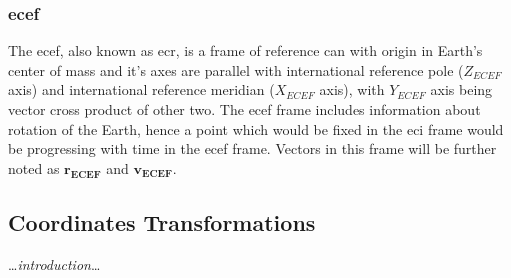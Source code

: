     \subsubsection{\ac*{ecef}}
        The \ac{ecef}, also known as \ac{ecr}, is a frame of reference can with origin in Earth's center of mass and it's axes are parallel with international reference pole ($Z_{ECEF}$ axis) and international reference meridian ($X_{ECEF}$ axis), with $Y_{ECEF}$ axis being vector cross product of other two. The \ac{ecef} frame includes information about rotation of the Earth, hence a point which would be fixed in the \ac{eci} frame would be progressing with time in the \ac{ecef} frame. Vectors in this frame will be further noted as $\textbf{r}_{\textbf{ECEF}}$ and $\textbf{v}_{\textbf{ECEF}} $.


\subsection{Coordinates Transformations}
    \dots\textit{introduction}\dots

    
